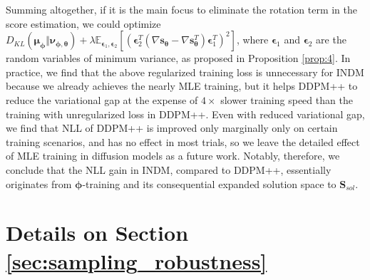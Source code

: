 \documentclass{article}
\theoremstyle{definition}
\theoremstyle{remark}
\begin{document}
	Summing altogether, if it is the main focus to eliminate the rotation term in the score estimation, we could optimize $D_{KL}(\bm{\mu}_{\bm{\phi}}\Vert\bm{\nu}_{\bm{\phi},\bm{\theta}})+\lambda\mathbb{E}_{\bm{\bm{\epsilon}}_{1},\bm{\bm{\epsilon}}_{2}}\left[(\bm{\bm{\epsilon}}_{2}^{T}(\nabla\mathbf{s}_{\bm{\theta}}-\nabla\mathbf{s}_{\bm{\theta}}^{T})\bm{\bm{\epsilon}}_{1}^{T})^{2}\right]$, where $\bm{\bm{\epsilon}}_{1}$ and $\bm{\bm{\epsilon}}_{2}$ are the random variables of minimum variance, as proposed in Proposition \ref{prop:4}. In practice, we find that the above regularized training loss is unnecessary for INDM because we already achieves the nearly MLE training, but it helps DDPM++ to reduce the variational gap at the expense of $4\times$ slower training speed than the training with unregularized loss in DDPM++. Even with reduced variational gap, we find that NLL of DDPM++ is improved only marginally only on certain training scenarios, and has no effect in most trials, so we leave the detailed effect of MLE training in diffusion models as a future work. Notably, therefore, we conclude that the NLL gain in INDM, compared to DDPM++, essentially originates from $\bm{\phi}$-training and its consequential expanded solution space to $\mathbf{S}_{sol}$.
	
	\section{Details on Section \ref{sec:sampling_robustness}}\label{appendix:sample_robustness}
	
\end{document}
